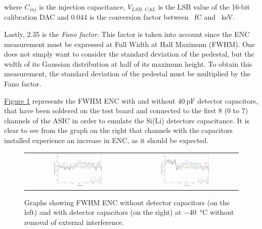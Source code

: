 \noindent
where $C_{\textit{inj}}$ is the injection capacitance, $V_{\textit{LSB, CAL}}$ is the LSB value of the 16-bit calibration DAC and \SI{0.044}{} is the conversion factor between \SI{}{fC} and \SI{}{\kilo\electronvolt}.

\par
Lastly, 2.35 is the \textit{Fano factor}. This factor is taken into account since the ENC measurement must be expressed at Full Width at Half Maximum (FWHM). One does not simply want to consider the standard deviation of the pedestal, but the width of its Gaussian distribution at half of its maximum height. To obtain this measurement, the standard deviation of the pedestal must be multiplied by the Fano factor.

\par
\hyperref[figENCnormal]{Figure \ref{figENCnormal}} represents the FWHM ENC with and without $\SI{40}{\pico\farad}$ detector capacitors, that have been soldered on the test board and connected to the first 8 (0 to 7) channels of the ASIC in order to emulate the Si(Li) detectors capacitance. It is clear to see from the graph on the right that channels with the capacitors installed experience an increase in ENC, as it should be expected. \cite{iakovidis_2018_vmm}

\begin{figure}[ht]
    \centering
    \begin{tabular}{cc}
         \includegraphics[width=0.475\textwidth]{Images/chap1/results/ENC_minus40C/ASIC_cold_wocaps_normal.pdf} &  \includegraphics[width=0.475\textwidth]{Images/chap1/results/ENC_minus40C/ASIC_cold_wcaps_normal.pdf} \\
    \end{tabular}
    \caption{Graphs showing FWHM ENC without detector capacitors (on the left) and with detector capacitors (on the right) at \SI{-40}{\celsius} without removal of external interference.}
    \label{figENCnormal}
\end{figure}

